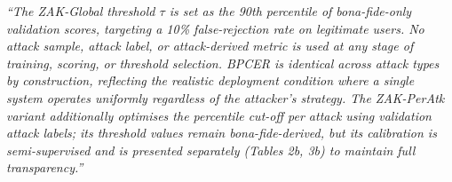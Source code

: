 \documentclass{article}
\begin{document}
\begin{tcolorbox}[
  colback=warnamber!80,
  colframe=orange!70!black,
  title={\textbf{Reviewer-Facing Claim (safe to assert)}},
  fonttitle=\small\bfseries,
  fontupper=\small
]
\textit{``The ZAK-Global threshold $\tau$ is set as the 90th percentile of
bona-fide-only validation scores, targeting a 10\% false-rejection rate on
legitimate users.
No attack sample, attack label, or attack-derived metric is used at any
stage of training, scoring, or threshold selection.
BPCER is identical across attack types by construction, reflecting the
realistic deployment condition where a single system operates uniformly
regardless of the attacker's strategy.
The ZAK-PerAtk variant additionally optimises the percentile cut-off per
attack using validation attack labels; its threshold values remain
bona-fide-derived, but its calibration is semi-supervised and is presented
separately (Tables 2b, 3b) to maintain full transparency.''}
\end{tcolorbox}
\end{document}
